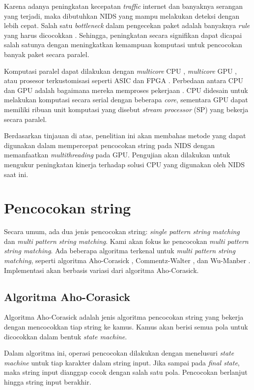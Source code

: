 \documentclass[conference]{IEEEtran}
\begin{document}
Karena adanya peningkatan kecepatan \emph{traffic} internet dan banyaknya serangan yang terjadi, maka dibutuhkan NIDS yang mampu melakukan deteksi dengan lebih cepat. Salah satu \emph{bottleneck} dalam pengecekan paket adalah banyaknya \emph{rule} yang harus dicocokkan \cite{pcre2007}. Sehingga, peningkatan secara signifikan dapat dicapai salah satunya dengan meningkatkan kemampuan komputasi untuk pencocokan banyak paket secara paralel. 

Komputasi paralel dapat dilakukan dengan \emph{multicore} CPU \cite{multi2004}, \emph{multicore} GPU \cite{gnort2008}, atau prosesor terkustomisasi seperti ASIC dan FPGA \cite{fpga2008}. Perbedaan antara CPU dan GPU adalah bagaimana mereka memproses pekerjaan \cite{cuda}. CPU didesain untuk melakukan komputasi secara serial dengan beberapa \emph{core}, sementara GPU dapat memiliki ribuan unit komputasi yang disebut \emph{stream processor} (SP) yang bekerja secara paralel.

Berdasarkan tinjauan di atas, penelitian ini akan membahas metode yang dapat digunakan dalam mempercepat pencocokan string pada NIDS dengan memanfaatkan \emph{multithreading} pada GPU. Pengujian akan dilakukan untuk mengukur peningkatan kinerja terhadap solusi CPU yang digunakan oleh NIDS saat ini.

\section{Pencocokan string}
Secara umum, ada dua jenis pencocokan string: \emph{single pattern string matching} dan \emph{multi pattern string matching}. Kami akan fokus ke pencocokan \emph{multi pattern string matching}. Ada beberapa algoritma terkenal untuk \emph{multi pattern string matching}, seperti algoritma Aho-Corasick \cite{ahoc1975}, Commentz-Walter \cite{walter1980}, dan Wu-Manber \cite{wu92}. Implementasi akan berbasis variasi dari algoritma Aho-Corasick.

    \subsection{Algoritma Aho-Corasick}
    Algoritma Aho-Corasick adalah jenis algoritma pencocokan string yang bekerja dengan mencocokkan tiap string ke kamus. Kamus akan berisi semua pola untuk dicocokkan dalam bentuk \emph{state machine}.
    
    Dalam algoritma ini, operasi pencocokan dilakukan dengan menelusuri \emph{state machine} untuk tiap karakter dalam string input. Jika sampai pada \emph{final state}, maka string input dianggap cocok dengan salah satu pola. Pencocokan berlanjut hingga string input berakhir. 
\end{document}
